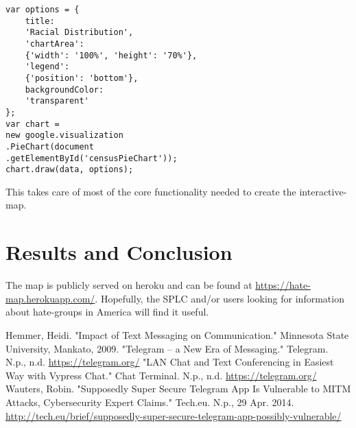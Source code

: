 \documentclass[twoside]{article}
\begin{document}
\begin{multicols}{2}
\begin{verbatim}
var options = {
    title: 
    'Racial Distribution',
    'chartArea': 
    {'width': '100%', 'height': '70%'},
    'legend': 
    {'position': 'bottom'},
    backgroundColor: 
    'transparent'
};
var chart = 
new google.visualization
.PieChart(document
.getElementById('censusPieChart'));
chart.draw(data, options);
\end{verbatim}
This takes care of most of the core functionality needed to create the interactive-map.




\section{Results and Conclusion}
The map is publicly served on heroku and can be found at \url{https://hate-map.herokuapp.com/}. Hopefully, the SPLC and/or users looking for information
about hate-groups in America will find it useful.


\begin{thebibliography}{99} %
Hemmer, Heidi. "Impact of Text Messaging on Communication." Minnesota State University, Mankato, 2009.
"Telegram – a New Era of Messaging." Telegram. N.p., n.d.  \href{https://telegram.org/}{https://telegram.org/}
 "LAN Chat and Text Conferencing in Easiest Way with Vypress Chat." Chat Terminal. N.p., n.d.  \href{https://www.census.gov/geo/maps-data/data/tiger.html}{https://telegram.org/}
Wauters, Robin. "Supposedly Super Secure Telegram App Is Vulnerable to MITM Attacks, Cybersecurity Expert Claims." Tech.eu. N.p., 29 Apr. 2014.  \href{http://tech.eu/brief/supposedly-super-secure-telegram-app-possibly-vulnerable/}{http://tech.eu/brief/supposedly-super-secure-telegram-app-possibly-vulnerable/} 

\end{thebibliography}


\end{multicols}
\end{document}
